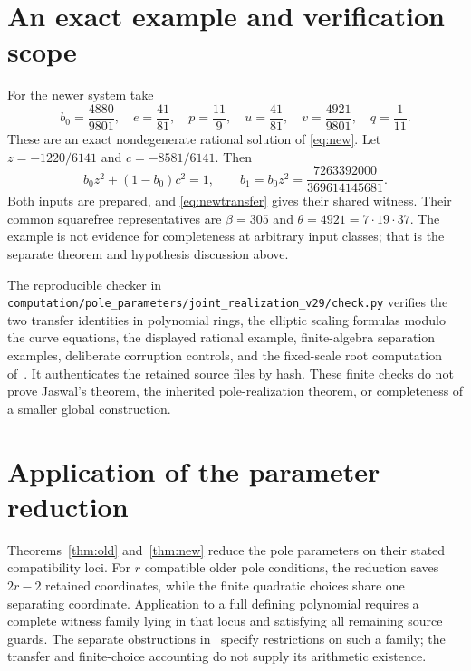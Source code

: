 \documentclass[11pt,a4paper]{article}
\theoremstyle{definition}\newtheorem{definition}[theorem]{Definition}
\theoremstyle{remark}\newtheorem{remark}[theorem]{Remark}
\begin{document}
\section{An exact example and verification scope}
For the newer system take
\[
 b_0=\frac{4880}{9801},\quad e=\frac{41}{81},\quad
 p=\frac{11}{9},\quad u=\frac{41}{81},\quad
 v=\frac{4921}{9801},\quad q=\frac1{11}.
\]
These are an exact nondegenerate rational solution of \eqref{eq:new}.
Let $z=-1220/6141$ and $c=-8581/6141$. Then
\[
 b_0z^2+(1-b_0)c^2=1,\qquad
 b_1=b_0z^2=\frac{7263392000}{369614145681}.
\]
Both inputs are prepared, and \eqref{eq:newtransfer} gives their shared
witness. Their common squarefree representatives are
$\beta=305$ and $\theta=4921=7\cdot19\cdot37$.
The example is not evidence for completeness at arbitrary input
classes; that is the separate theorem and hypothesis discussion above.

The reproducible checker in
\nolinkurl{computation/pole_parameters/joint_realization_v29/check.py}
verifies the two transfer identities in polynomial rings, the elliptic
scaling formulas modulo the curve equations, the displayed rational
example, finite-algebra separation examples, deliberate corruption
controls, and the fixed-scale root computation of~\cite{MatchingObstructions}.
It authenticates the
retained source files by hash. These finite checks do not prove
Jaswal's theorem, the inherited pole-realization theorem, or
completeness of a smaller global construction.

\section{Application of the parameter reduction}
Theorems~\ref{thm:old} and~\ref{thm:new} reduce the pole parameters
on their stated compatibility loci. For $r$ compatible older pole
conditions, the reduction saves $2r-2$ retained coordinates, while
the finite quadratic choices share one separating coordinate.
Application to a full defining polynomial requires a complete
witness family lying in that locus and satisfying all remaining
source guards. The separate obstructions in~\cite{MatchingObstructions}
specify restrictions on such a family; the transfer and
finite-choice accounting do not supply its arithmetic existence.
\end{document}
